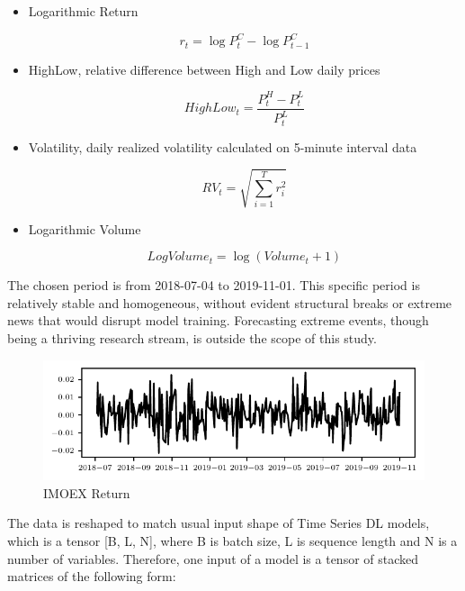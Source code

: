 \documentclass[review, authoryear]{elsarticle}
\begin{document}
\begin{itemize}
\item Logarithmic Return

\begin{equation}
r_t = \log{P_{t}^C} - \log{P_{t-1}^C}
\end{equation}

\item HighLow, relative difference between High and Low daily prices

\begin{equation}
HighLow_t = \frac{P^{H}_t - P^{L}_{t}}{P^{L}_{t}}
\end{equation}

\item Volatility, daily realized volatility calculated on 5-minute interval data

\begin{equation}
RV_t = \sqrt{ \sum_{i=1}^{T} r_i^2}
\end{equation}

\item Logarithmic Volume

\begin{equation}
LogVolume_t = \log{(Volume_t+1)}
\end{equation}

\end{itemize}

The chosen period is from 2018-07-04 to 2019-11-01. This specific period is relatively stable and homogeneous, without evident structural breaks or extreme news that would disrupt model training. Forecasting extreme events, though being a thriving research stream, is outside the scope of this study.

\begin{figure}[h]
	\centering
	\includegraphics[width=\textwidth]{series.pdf}
	\caption{IMOEX Return}
	\label{fig:series}
\end{figure}

The data is reshaped to match usual input shape of Time Series DL models, which is a tensor [B, L, N], where B is batch size, L is sequence length and N is a number of variables. Therefore, one input of a model is a tensor of stacked matrices of the following form:
\end{document}
